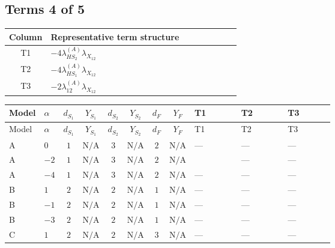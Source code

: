 \documentclass[8pt]{article}
\begin{document}
\begin{landscape}
\subsection*{Terms 4 of 5}
\begin{center}
\begin{tabular}{@{}c >{\raggedright\arraybackslash}p{0.82\linewidth}@{}}
\toprule
Column & Representative term structure \\
\midrule
T1 & \(\displaystyle -4 {\lambda_{HS_2}^{(A)}} {\lambda_{X_{12}}}\) \\
\midrule
T2 & \(\displaystyle -4 {\lambda_{HS_1}^{(A)}} {\lambda_{X_{12}}}\) \\
\midrule
T3 & \(\displaystyle -2 {\lambda_{12}^{(A)}} {\lambda_{X_{12}}}\) \\
\midrule
\bottomrule
\end{tabular}
\end{center}
\smallskip
\tiny
\begin{longtable}{@{}llcccccc >{\raggedright\arraybackslash}p{0.21\linewidth} >{\raggedright\arraybackslash}p{0.21\linewidth} >{\raggedright\arraybackslash}p{0.21\linewidth}@{}}
\toprule
Model & $\alpha$ & $d_{S_1}$ & $Y_{S_1}$ & $d_{S_2}$ & $Y_{S_2}$ & $d_F$ & $Y_F$ & T1 & T2 & T3 \\
\midrule
\endfirsthead
\toprule
Model & $\alpha$ & $d_{S_1}$ & $Y_{S_1}$ & $d_{S_2}$ & $Y_{S_2}$ & $d_F$ & $Y_F$ & T1 & T2 & T3 \\
\midrule
\endhead
A & $0$ & $1$ & $\text{N/A}$ & $3$ & $\text{N/A}$ & $2$ & $\text{N/A}$ & --- & --- & --- \\
\midrule
A & $-2$ & $1$ & $\text{N/A}$ & $3$ & $\text{N/A}$ & $2$ & $\text{N/A}$ & \scriptsize\adjustbox{max width=\linewidth}{$\begin{gathered} -4 {\lambda_{HS_2}^{(A)}} {\lambda_{X_{12}}}\end{gathered}$} & --- & --- \\
\midrule
A & $-4$ & $1$ & $\text{N/A}$ & $3$ & $\text{N/A}$ & $2$ & $\text{N/A}$ & --- & --- & --- \\
\midrule
B & $1$ & $2$ & $\text{N/A}$ & $2$ & $\text{N/A}$ & $1$ & $\text{N/A}$ & --- & --- & --- \\
\midrule
B & $-1$ & $2$ & $\text{N/A}$ & $2$ & $\text{N/A}$ & $1$ & $\text{N/A}$ & --- & --- & --- \\
\midrule
B & $-3$ & $2$ & $\text{N/A}$ & $2$ & $\text{N/A}$ & $1$ & $\text{N/A}$ & --- & --- & --- \\
\midrule
C & $1$ & $2$ & $\text{N/A}$ & $2$ & $\text{N/A}$ & $3$ & $\text{N/A}$ & --- & --- & --- \\

\end{longtable}
\end{landscape}
\end{document}
